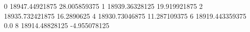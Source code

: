 0 18947.44921875 28.005859375
1 18939.36328125 19.919921875
2 18935.732421875 16.2890625
4 18930.73046875 11.287109375
6 18919.443359375 0.0
8 18914.48828125 -4.955078125
